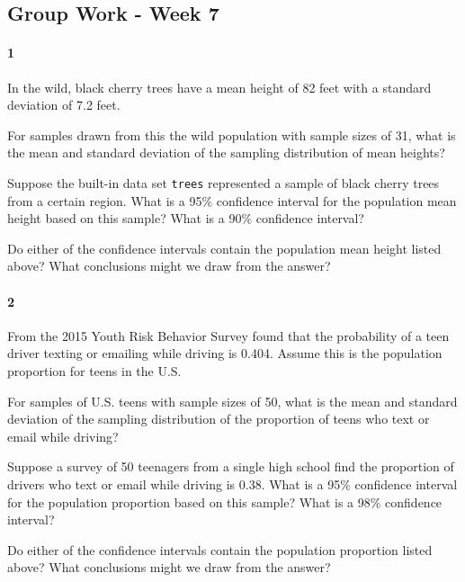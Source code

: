 \documentclass{article}
\begin{document}
\begin{flushleft}
\section*{Group Work - Week 7}
\paragraph{1} In the wild, black cherry trees have a mean height of 82 feet with a standard deviation of 7.2 feet. 
\begin{enumalpha}
\item For samples drawn from this the wild population with sample sizes of 31, what is the mean and standard deviation of the sampling distribution of mean heights?

\vspace{2in}
\item Suppose the built-in data set \verb+trees+ represented a sample of black cherry trees from a certain region. What is a 95\% confidence interval for the population mean height based on this sample? What is a 90\% confidence interval? 

\vspace{2in}
\item Do either of the confidence intervals contain the population mean height listed above? What conclusions might we draw from the answer?
\end{enumalpha}

\newpage

\paragraph{2} From the 2015 Youth Risk Behavior Survey found that the probability of a teen driver texting or emailing while driving is 0.404. Assume this is the population proportion for teens in the U.S.

\begin{enumalpha}
\item For samples of U.S. teens with sample sizes of 50, what is the mean and standard deviation of the sampling distribution of the proportion of teens who text or email while driving?

\vspace{2in}
\item Suppose a survey of 50 teenagers from a single high school find the proportion of drivers who text or email while driving is 0.38. What is a 95\% confidence interval for the population proportion based on this sample? What is a 98\% confidence interval? 

\vspace{2in}
\item Do either of the confidence intervals contain the population proportion listed above? What conclusions might we draw from the answer?
\end{enumalpha}

\end{flushleft}
\end{document}
